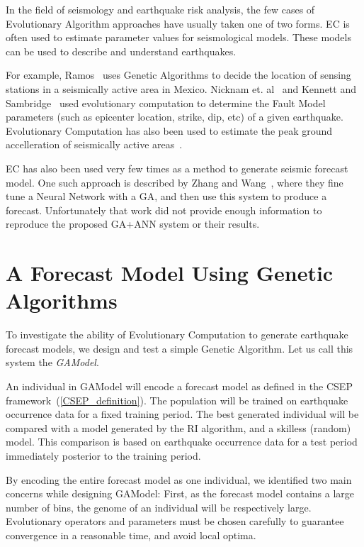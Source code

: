 \documentclass{sig-alternate}
\begin{document}
In the field of seismology and earthquake risk analysis, the few cases
of Evolutionary Algorithm approaches have usually taken one of two
forms. EC is often used to estimate parameter values for seismological
models.  These models can be used to describe and understand
earthquakes.

For example, Ramos~\cite{Ramos2011} uses Genetic Algorithms to decide
the location of sensing stations in a seismically active area in
Mexico. Nicknam et. al~\cite{Nicknam2010} and Kennett and
Sambridge~\cite{Kennett1992} used evolutionary computation to
determine the Fault Model parameters (such as epicenter location,
strike, dip, etc) of a given earthquake. Evolutionary Computation has
also been used to estimate the peak ground accelleration of
seismically active areas~\cite{Kermani2009, Cabalar2009}.

EC has also been used very few times as a method to generate seismic
forecast model. One such approach is described by Zhang and
Wang~\cite{Zhang2012}, where they fine tune a Neural Network with a
GA, and then use this system to produce a forecast. Unfortunately that
work did not provide enough information to reproduce the proposed
GA+ANN system or their results.

\section{A Forecast Model Using Genetic Algorithms}

To investigate the ability of Evolutionary Computation to generate
earthquake forecast models, we design and test a simple Genetic
Algorithm. Let us call this system the \emph{GAModel}.

An individual in GAModel will encode a forecast model as defined in
the CSEP framework~(\ref{CSEP_definition}). The population will be
trained on earthquake occurrence data for a fixed training period. The
best generated individual will be compared with a model generated by
the RI algorithm, and a skilless (random) model. This comparison is
based on earthquake occurrence data for a test period immediately
posterior to the training period.

By encoding the entire forecast model as one individual, we identified
two main concerns while designing GAModel: First, as the forecast
model contains a large number of bins, the genome of an individual
will be respectively large. Evolutionary operators and parameters must
be chosen carefully to guarantee convergence in a reasonable time, and
avoid local optima.
\end{document}
